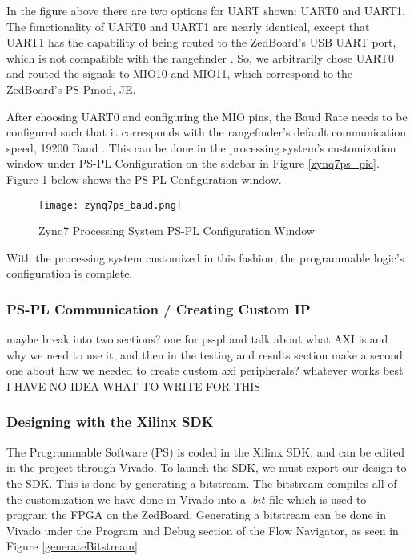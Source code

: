In the figure above there are two options for UART shown: UART0 and UART1. The functionality of UART0 and UART1 are nearly identical, except that UART1 has the capability of being routed to the ZedBoard's USB UART port, which is not compatible with the rangefinder \cite{zedboard_datasheet}. So, we arbitrarily chose UART0 and routed the signals to MIO10 and MIO11, which correspond to the ZedBoard's PS Pmod, JE.
\par
After choosing UART0 and configuring the MIO pins, the Baud Rate needs to be configured such that it corresponds with the rangefinder's default communication speed, 19200 Baud \cite{urg04lx_datasheet}. This can be done in the processing system's customization window under PS-PL Configuration on the sidebar in Figure \ref{zynq7ps_pic}. Figure \ref{zynq7ps_baud_pic} below shows the PS-PL Configuration window.

\begin{figure}[H]
	\centerline{\texttt{[image: zynq7ps\_baud.png]}}
	\caption{Zynq7 Processing System PS-PL Configuration Window}
	\label{zynq7ps_baud_pic}
\end{figure}

With the processing system customized in this fashion, the programmable logic's configuration is complete.

\subsubsection{PS-PL Communication / Creating Custom IP}
\label{sssec:ps_pl}



maybe break into two sections? one for ps-pl and talk about what AXI is and why we need to use it, and then in the testing and results section make a second one about how we needed to create custom axi peripherals? whatever works best
I HAVE NO IDEA WHAT TO WRITE FOR THIS

\subsubsection{Designing with the Xilinx SDK}
The Programmable Software (PS) is coded in the Xilinx SDK, and can be edited in the project through Vivado. To launch the SDK, we must export our design to the SDK. This is done by generating a bitstream. The bitstream compiles all of the customization we have done in Vivado into a $.bit$ file which is used to program the FPGA on the ZedBoard. Generating a bitstream can be done in Vivado under the Program and Debug section of the Flow Navigator, as seen in Figure \ref{generateBitstream}.

